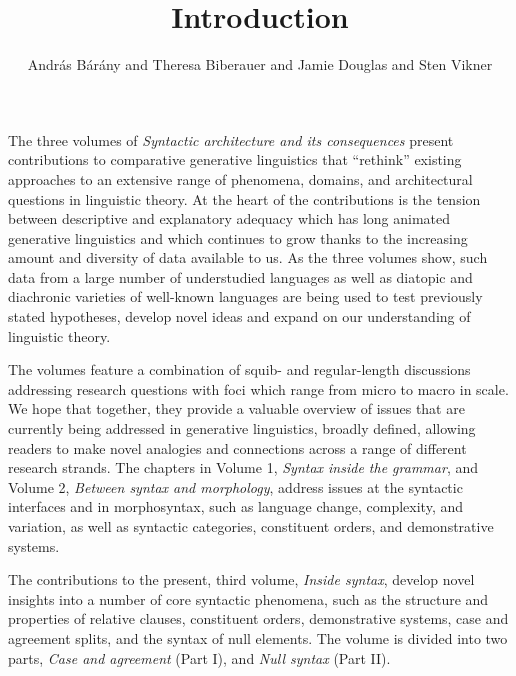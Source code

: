 \documentclass[output=paper]{langsci/langscibook}
\author{András Bárány\affiliation{Bielefeld University} and
        Theresa Biberauer\affiliation{University of Cambridge, Stellenbosch
        University \& University of the West Cape} and
        Jamie Douglas\affiliation{University of Cambridge} and
        Sten Vikner\affiliation{Aarhus University}}
\title{Introduction}
\begin{document}
\maketitle

\noindent The three volumes of \emph{Syntactic architecture and its
consequences} present contributions to comparative generative linguistics that
\enquote{rethink} existing approaches to an extensive range of phenomena,
domains, and architectural questions in linguistic theory. At the heart of the
contributions is the tension between descriptive and explanatory adequacy which
has long animated generative linguistics and which continues to grow thanks to
the increasing amount and diversity of data available to us. As the three
volumes show, such data from a large number of understudied languages as well
as diatopic and diachronic varieties of well-known languages are being used to
test previously stated hypotheses, develop novel ideas and expand on our
understanding of linguistic theory.

The volumes feature a combination of squib- and regular-length discussions
addressing research questions with foci which range from micro to macro in
scale. We hope that together, they provide a valuable overview of issues that
are currently being addressed in generative linguistics, broadly defined,
allowing readers to make novel analogies and connections across a range of
different research strands. The chapters in Volume 1, \emph{Syntax inside the
grammar}, and Volume 2, \emph{Between syntax and morphology}, address issues at
the syntactic interfaces and in morphosyntax, such as language change,
complexity, and variation, as well as syntactic categories, constituent orders,
and demonstrative systems.

The contributions to the present, third volume, \emph{Inside syntax}, develop
novel insights into a number of core syntactic phenomena, such as the structure
and properties of relative clauses, constituent orders, demonstrative systems,
case and agreement splits, and the syntax of null elements. The volume is
divided into two parts, \emph{Case and agreement} (Part I), and \emph{Null
syntax} (Part II).
\end{document}
